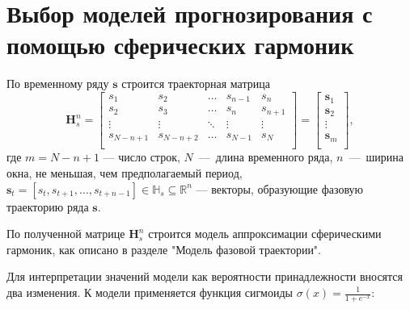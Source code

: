 \documentclass[article,14pt,subf,href,colorlinks=true
]{disser}
\begin{document}

\newpage
\section{Выбор моделей прогнозирования с помощью сферических гармоник}

По временному ряду $\mathbf{s}$ строится траекторная матрица
\begin{equation*}
    \mathbf{H}_{s}^{n} = 
    \begin{bmatrix} 
    	s_{1} & s_{2} & \ldots &s_{n-1} &s_{n}\\
    	s_{2} & s_{3} & \ldots &s_{n} &s_{n+1}\\
    	\vdots& \vdots & \ddots & \vdots & \vdots\\
    	s_{N-n+1} & s_{N-n+2} &\ldots&s_{N-1} &s_{N}\\
    \end{bmatrix} = 
	\begin{bmatrix} 
      	\mathbf{s}_{1}\\
      	\mathbf{s}_{2}\\
      	\vdots\\
      	\mathbf{s}_{m}\\
   \end{bmatrix},
\label{eq:hankel_matri_2}
\end{equation*}
где $m = N-n+1$ --- число строк, $N$~---~длина временного ряда, $n$~---~ширина окна, не меньшая, чем предполагаемый период,  $\mathbf{s}_t=[s_{t},s_{t+1},\ldots,s_{t+n-1}] \in \mathbb{H}_{s} \subseteq \mathbb{R}^{n}$ --- векторы, образующие фазовую траекторию ряда $\mathbf{s}$.

По полученной матрице $\mathbf{H}_{s}^{n}$ строится модель аппроксимации сферическими гармоник, как описано в разделе "Модель фазовой траектории".

Для интерпретации значений модели как вероятности принадлежности вносятся два изменения.
К модели применяется функция сигмоиды $\sigma(x) = \frac{1}{1 + e^{-x}}$:
\end{document}
